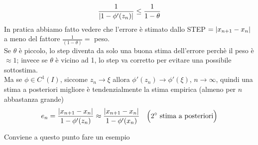 \begin{enumerate}
    \[ \frac{1}{\lvert1-\phi'(z_n)\rvert} \le \frac{1}{1-\theta} \]
    In pratica abbiamo fatto vedere che l'errore è stimato dallo STEP $= \lvert x_{n+1}-x_n\rvert$ a meno del fattore $\frac{1}{(1-\theta)}=$ peso.\\
    Se $\theta$ è piccolo, lo step diventa da solo una buona stima dell'errore perchè il peso è $\approx 1$; invece se $\theta$ è vicino ad 1, lo step va corretto per evitare una possibile sottostima.\\
    Ma se $\phi \in C^1(I)$, siccome $z_n \to \xi$ allora $\phi'(z_n) \to \phi'(\xi)$, $n \to \infty$, quindi una stima a posteriori migliore è tendenzialmente la stima empirica (almeno per $n$ abbastanza grande)
    \[e_n = \frac{\lvert x_{n+1}-x_n\rvert}{1-\phi'(z_n)} \approx \frac{\lvert x_{n+1}-x_n\rvert}{1-\phi'(x_n)} \quad \Bigl( 2^\circ \text{ stima a posteriori}\Bigr)\]
\end{enumerate}
Conviene a questo punto fare un esempio

